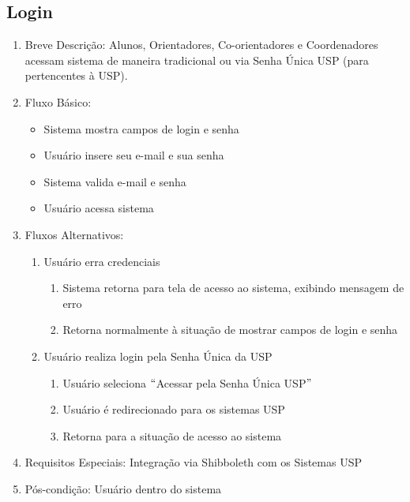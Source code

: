 \subsection{Login}
\begin{enumerate}
    \item Breve Descrição: Alunos, Orientadores, Co-orientadores e Coordenadores acessam sistema de maneira tradicional ou via Senha Única USP (para pertencentes à USP).
    \item Fluxo Básico:
    \begin{itemize}
        \item Sistema mostra campos de login e senha
        \item Usuário insere seu e-mail e sua senha
        \item Sistema valida e-mail e senha
        \item Usuário acessa sistema
    \end{itemize}
    \item Fluxos Alternativos:
    \begin{enumerate}
        \item Usuário erra credenciais
        \begin{enumerate}
            \item Sistema retorna para tela de acesso ao sistema, exibindo mensagem de erro
            \item Retorna normalmente à situação de mostrar campos de login e senha
        \end{enumerate}
        \item Usuário realiza login pela Senha Única da USP
        \begin{enumerate}
            \item Usuário seleciona $``$Acessar pela Senha Única USP$"$ 
            \item Usuário é redirecionado para os sistemas USP
            \item Retorna para a situação de acesso ao sistema
        \end{enumerate}
    \end{enumerate}
    \item Requisitos Especiais: Integração via Shibboleth com os Sistemas USP
    \item Pós-condição: Usuário dentro do sistema
\end{enumerate}

